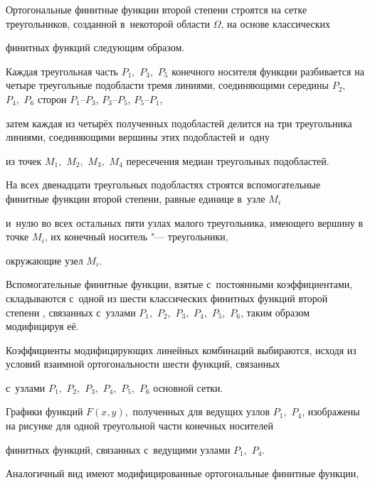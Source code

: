 \maketitle





Ортогональные финитные функции второй степени строятся на сетке треугольников, созданной в~некоторой области $\Omega $, на основе классических 

финитных функций \cite[с.~125--130]{leont:cite:1} следующим образом. 

Каждая треугольная  часть $P_{1},$ $P_{3},$ $P_{5}$ конечного носителя функции \cite{leont:cite:1} разбивается на четыре треугольные подобласти тремя линиями, соединяющими середины  $P_{2},$ $P_{4},$ $P_{6}$ сторон $P_{1}$--$P_{3}$, $P_{3}$--$P_{5}$, $P_{5}$--$P_{1}$, 

затем каждая из четырёх полученных подобластей делится на три  треугольника линиями, соединяющими вершины этих подобластей и~одну 

из точек $M_{1},$ $M_{2},$ $M_{3},$ $M_{4}$ пересечения медиан треугольных подобластей. 

На всех двенадцати треугольных подобластях строятся вспомогательные финитные функции второй степени, равные единице в~узле $M_{i}$ 

и~нулю во всех остальных пяти узлах малого треугольника, имеющего вершину в точке $M_{i}$, их конечный носитель "--- треугольники, 

окружающие узел $M_{i}$. 

Вспомогательные финитные функции, взятые с~постоянными коэффициентами, складываются с~одной из шести классических финитных функций второй степени \cite{leont:cite:1}, связанных с~узлами $P_{1},$ $P_{2},$ $P_{3},$ $P_{4},$ $P_{5},$ $P_{6}$, таким образом модифицируя её. 

Коэффициенты модифицирующих линейных комбинаций выбираются, исходя из условий взаимной ортогональности шести функций, связанных 

с~узлами $P_{1},$ $P_{2},$ $P_{3},$ $P_{4},$ $P_{5},$ $P_{6}$ основной сетки. 

Графики функций $F(x,y),$ полученных для ведущих узлов $P_{1},$ $P_{4}$,  изображены на рисунке для одной треугольной части конечных носителей 

финитных функций, связанных с~ведущими узлами $P_{1},$ $P_{4}$. 

Аналогичный вид имеют модифицированные ортогональные финитные функции, 

